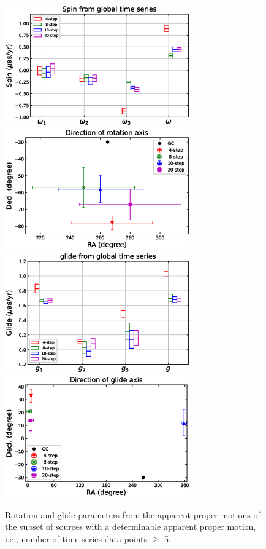 \documentclass{aa-note}    %
\begin{document}
 \begin{figure}%
   \centering
   \includegraphics[width=80mm]{figs/spin-vs-nb-step-all} 
   \includegraphics[width=80mm]{figs/spin-axis-vs-nb-step-all} \\
   \includegraphics[width=80mm]{figs/glide-vs-nb-step-all} 
   \includegraphics[width=80mm]{figs/glide-axis-vs-nb-step-all}  
   \caption[]{\label{fig:spin-all} %
   Rotation and glide parameters from the apparent proper motions of the subset of sources with a determinable apparent proper motion, i.e., number of time series data points $\ge$ 5.
   }
 \end{figure}
\end{document}
